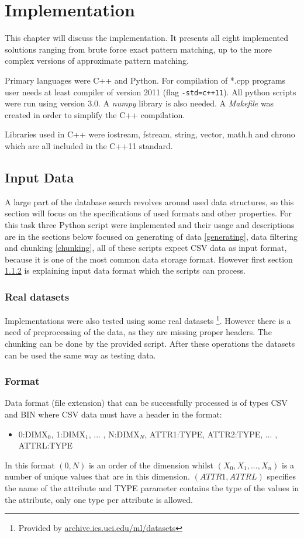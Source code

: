 \chapter{Implementation} \label{implementation}
This chapter will discuss the implementation. It presents all eight implemented solutions ranging from brute force exact pattern matching, up to the more complex versions of approximate pattern matching. 

Primary languages were C++ and Python. For compilation of *.cpp programs user needs at least compiler of version 2011 (flag \texttt{-std=c++11}). All python scripts were run using version 3.0. A \textit{numpy} library is also needed. A \textit{Makefile} was created in order to simplify the C++ compilation.

Libraries used in C++ were iostream, fstream, string, vector, math.h and chrono which are all included in the C++11 standard.

\section{Input Data}
A large part of the database search revolves around used data structures, so this section will focus on the specifications of used formats and other properties. For this task three Python script were implemented and their usage and descriptions are in the sections below focused on generating of data \ref{generating}, data filtering and chunking \ref{chunking}, all of these scripts expect CSV data as input format, because it is one of the most common data storage format. However first section \ref{format} is explaining input data format which the scripts can process.

\subsection{Real datasets}
Implementations were also tested using some real datasets \footnote{Provided by \url{archive.ics.uci.edu/ml/datasets}}. However there is a need of preprocessing of the data, as they are missing proper headers. The chunking can be done by the provided script. After these operations the datasets can be used the same way as testing data.

\subsection{Format}\label{format}
Data format (file extension) that can be successfully processed is of types CSV and BIN where CSV data must have a header in the format:
\begin{itemize}
\item 0:DIMX$_0$, 1:DIMX$_1$, ... , N:DIMX$_N$, ATTR1:TYPE, ATTR2:TYPE, ... , ATTRL:TYPE
\end{itemize}
In this format $(0, N)$ is an order of the dimension whilst $(X_0, X_1, ... , X_n)$ is a number of unique values that are in this dimension. $(ATTR1, ATTRL)$ specifies the name of the attribute and TYPE parameter contains the type of the values in the attribute, only one type per attribute is allowed. 

